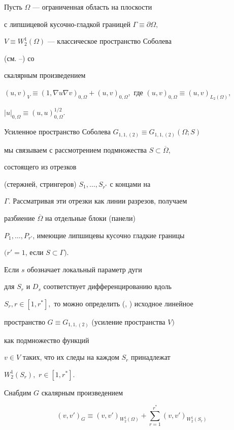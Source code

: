  Пусть $\Omega$ --- ограничен\-ная область на плоскости


с липшицевой кусочно-гладкой границей $\Gamma\equiv \partial \Omega,$


$V\equiv W_2^1 (\Omega)$ --- классическое пространство Соболева


(см. \cite{Bes}--\cite{Mi}) со


 скалярным произведением


$(u,v)_V\equiv (1,\nabla u \nabla v)_{0,\Omega}+


(u,v)_{0,\Omega},$ где $(u,v)_{0,\Omega}\equiv (u,v)_{L_2(\Omega)},$


$|u|_{0,\Omega}\equiv (u,u)^{1/2}_{0,\Omega}.$





Усиленное пространство Соболева $G_{1,1,(2)}\equiv G_{1,1,(2)}(\Omega;S)$


мы связы\-ваем с рассмотрением подмножества $S\subset\overline \Omega$,


 состоящего из отрез\-ков


(стержней, стрингеров) $S_1,\dotsc, S_{r^*}$ с концами на


 $\Gamma.$ Рассматри\-вая эти отрезки как линии разрезов, получаем


разбиение $\overline \Omega$ на отдельные блоки (панели)


 $ P_1,\dotsc, P_{r'}$, имеющие липшицевы кусочно гладкие границы


 $(r'=1$, если $S\subset \Gamma).$


Если $s$ обозначает локальный параметр дуги


для $S_r$ и $D_{s}$ соответствует дифференци\-рованию вдоль


$S_r,r\in[1,{r^*}],$ то можно определить (\cite{Dy1}, \cite{Dy2}) исходное линейное


пространство $G\equiv G_{1,1,(2)}$ (усиление пространства $V)$


как подмножество функций


 $v\in V$ таких, что их следы на каждом $S_r$ принадлежат


$W_2^1(S_r),$ $r\in[1,r^*].$





Снабдим $G$ скалярным произведением


\begin{equation}


(v,v')_{G}\equiv (v,v')_{W_2^1(\Omega)}+


\sum_{r=1}^{r^*}(v,v')_{W_2^1(S_r)}


\end{equation}


